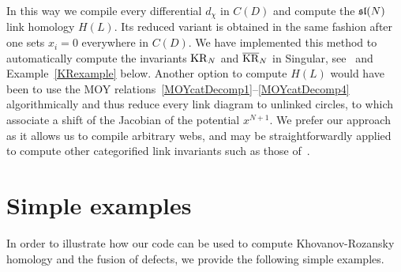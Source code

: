 \documentclass{compositio}
\theoremstyle{definition}
\numberwithin{equation}{section}
\begin{document}
In this way we compile every differential $d_{\chi}$ in $C(D)$ and compute the $\mathfrak{sl}(N)$ link homology $H(L)$. Its reduced variant is obtained in the same fashion after one sets $x_{i}=0$ everywhere in $C(D)$. We have implemented this method to automatically compute the invariants $\operatorname{KR}_{N}$ and $\overline{\operatorname{KR}}_{N}$ in Singular, see~\cite{cmWebCompileCode} and Example~\ref{KRexample} below. Another option to compute $H(L)$ would have been to use the MOY relations~\eqref{MOYcatDecomp1}--\eqref{MOYcatDecomp4} algorithmically and thus reduce every link diagram to unlinked circles, to which~\cite{kr0401268} associate a shift of the Jacobian of the potential $x^{N+1}$. We prefer our approach as it allows us to compile arbitrary webs, and may be straightforwardly applied to compute other categorified link invariants such as those of~\cite{kr0701333, w0907.0695}. 


\section{Simple examples}
\label{simpleexamples}

In order to illustrate how our code can be used to compute Khovanov-Rozansky homology and the fusion of defects, we provide the following simple examples. 
\end{document}
